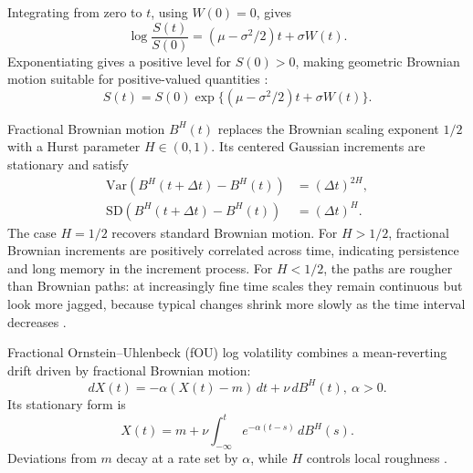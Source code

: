 \documentclass[12pt,a4paper]{article}
\numberwithin{equation}{section}
\numberwithin{table}{section}
\numberwithin{figure}{section}
\begin{document}
Integrating from zero to $t$, using $W(0)=0$, gives
\begin{equation}\label{eq:geometric-brownian-integral}
\log\frac{S(t)}{S(0)}=(\mu-\sigma^2/2)t+\sigma W(t).
\end{equation}
Exponentiating gives a positive level for $S(0)>0$, making geometric Brownian motion suitable for positive-valued quantities \cite{bachelier1900,samuelson1965,blackscholes1973}:
\begin{equation}\label{eq:geometric-brownian-solution}
S(t)=S(0)\exp\{(\mu-\sigma^2/2)t+\sigma W(t)\}.
\end{equation}

Fractional Brownian motion $B^H(t)$ replaces the Brownian scaling exponent $1/2$ with a Hurst parameter $H\in(0,1)$. Its centered Gaussian increments are stationary and satisfy
\begin{equation}\label{eq:fractional-scaling}
\begin{aligned}
\mathrm{Var}(B^H(t+\Delta t)-B^H(t))&=(\Delta t)^{2H},\\
\mathrm{SD}(B^H(t+\Delta t)-B^H(t))&=(\Delta t)^H.
\end{aligned}
\end{equation}
The case $H=1/2$ recovers standard Brownian motion. For $H>1/2$, fractional Brownian increments are positively correlated across time, indicating persistence and long memory in the increment process. For $H<1/2$, the paths are rougher than Brownian paths: at increasingly fine time scales they remain continuous but look more jagged, because typical changes shrink more slowly as the time interval decreases \cite{gatheral2018}.

Fractional Ornstein--Uhlenbeck (fOU) log volatility combines a mean-reverting drift driven by fractional Brownian motion:
\begin{equation}\label{eq:fou-dynamics}
dX(t)=-\alpha(X(t)-m)\,dt+\nu\,dB^H(t),\ \alpha>0.
\end{equation}
Its stationary form is
\begin{equation}\label{eq:fou-stationary}
X(t)=m+\nu\int_{-\infty}^{t}e^{-\alpha(t-s)}\,dB^H(s).
\end{equation}
Deviations from $m$ decay at a rate set by $\alpha$, while $H$ controls local roughness \cite{gatheral2018}.
\end{document}
